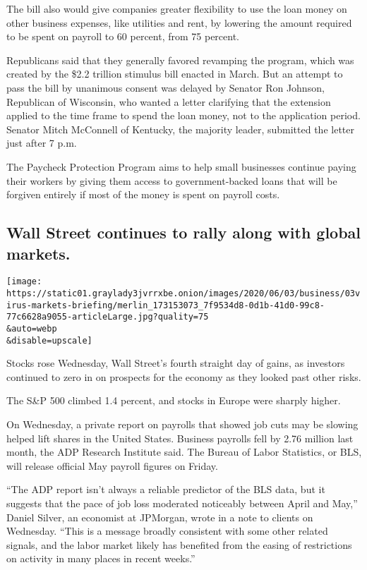 The bill also would give companies greater flexibility to use the loan
money on other business expenses, like utilities and rent, by lowering
the amount required to be spent on payroll to 60 percent, from 75
percent.

Republicans said that they generally favored revamping the program,
which was created by the \$2.2 trillion stimulus bill enacted in March.
But an attempt to pass the bill by unanimous consent was delayed by
Senator Ron Johnson, Republican of Wisconsin, who wanted a letter
clarifying that the extension applied to the time frame to spend the
loan money, not to the application period. Senator Mitch McConnell of
Kentucky, the majority leader, submitted the letter just after 7 p.m.

The Paycheck Protection Program aims to help small businesses continue
paying their workers by giving them access to government-backed loans
that will be forgiven entirely if most of the money is spent on payroll
costs.

\hypertarget{wall-street-continues-to-rally-along-with-global-markets}{%
\subsection{Wall Street continues to rally along with global
markets.}\label{wall-street-continues-to-rally-along-with-global-markets}}

\texttt{[image: https://static01.graylady3jvrrxbe.onion/images/2020/06/03/business/03virus-markets-briefing/merlin\_173153073\_7f9534d8-0d1b-41d0-99c8-77c6628a9055-articleLarge.jpg?quality=75\\\&auto=webp\\\&disable=upscale]}

Stocks rose Wednesday, Wall Street's fourth straight day of gains, as
investors continued to zero in on prospects for the economy as they
looked past other risks.

The S\&P 500 climbed 1.4 percent, and stocks in Europe were sharply
higher.

On Wednesday, a private report on payrolls that showed job cuts may be
slowing helped lift shares in the United States. Business payrolls fell
by 2.76 million last month, the ADP Research Institute said. The Bureau
of Labor Statistics, or BLS, will release official May payroll figures
on Friday.

``The ADP report isn't always a reliable predictor of the BLS data, but
it suggests that the pace of job loss moderated noticeably between April
and May,'' Daniel Silver, an economist at JPMorgan, wrote in a note to
clients on Wednesday. ``This is a message broadly consistent with some
other related signals, and the labor market likely has benefited from
the easing of restrictions on activity in many places in recent weeks.''

